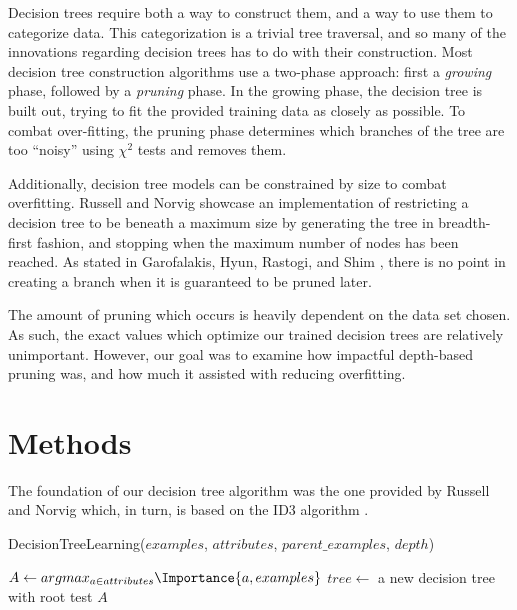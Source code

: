 \documentclass[screen, authorversion, nonacm, sigconf]{acmart}
\begin{document}
Decision trees require both a way to construct them, and a way to use them to categorize data. This categorization is a trivial tree traversal, and so many of the innovations regarding decision trees has to do with their construction. Most decision tree construction algorithms use a two-phase approach: first a \emph{growing} phase, followed by a \emph{pruning} phase. In the growing phase, the decision tree is built out, trying to fit the provided training data as closely as possible. To combat over-fitting, the pruning phase determines which branches of the tree are too ``noisy'' using $\chi^2$ tests and removes them.

Additionally, decision tree models can be constrained by size to combat overfitting. Russell and Norvig \cite{russell_norvig_2010} showcase an implementation of restricting a decision tree to be beneath a maximum size by generating the tree in breadth-first fashion, and stopping when the maximum number of nodes has been reached. As stated in Garofalakis, Hyun, Rastogi, and Shim \cite{Garofalakis:2000:EAC:347090.347163}, there is no point in creating a branch when it is guaranteed to be pruned later.

The amount of pruning which occurs is heavily dependent on the data set chosen. As such, the exact values which optimize our trained decision trees are relatively unimportant. However, our goal was to examine how impactful depth-based pruning was, and how much it assisted with reducing overfitting.

\section{Methods}

The foundation of our decision tree algorithm was the one provided by Russell and Norvig \cite{russell_norvig_2010} which, in turn, is based on the ID3 algorithm \cite{Quinlan1986}.

\begin{function}
  \caption{DecisionTreeLearning($examples$, $attributes$, $parent\_examples$, $depth$)}
  \label{algo:DecisionTreeLearning}
  $A \gets argmax_{a \in attributes} \Importance{a, examples}$\;
  $tree \gets$ a new decision tree with root test $A$\;
\end{function}
\end{document}
